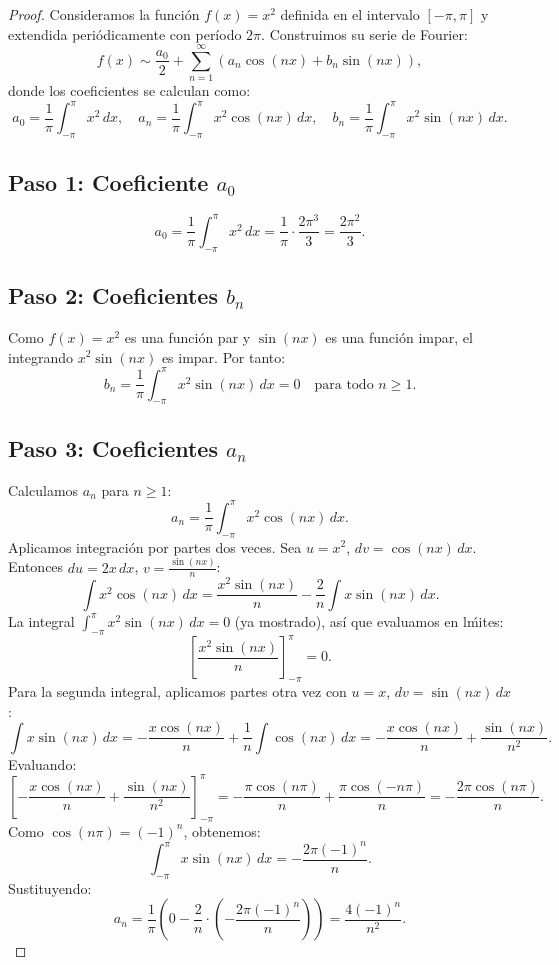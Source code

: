 \documentclass[11pt,a4paper]{article}
\theoremstyle{plain}
\theoremstyle{definition}
\begin{document}
\begin{proof}
Consideramos la funci\'on $f(x) = x^2$ definida en el intervalo $[-\pi, \pi]$ y extendida peri\'odicamente con per\'iodo $2\pi$. Construimos su serie de Fourier:
\[
f(x) \sim \frac{a_0}{2} + \sum_{n=1}^{\infty} \left( a_n \cos(nx) + b_n \sin(nx) \right),
\]
donde los coeficientes se calculan como:
\[
a_0 = \frac{1}{\pi} \int_{-\pi}^{\pi} x^2 \, dx, \quad
a_n = \frac{1}{\pi} \int_{-\pi}^{\pi} x^2 \cos(nx) \, dx, \quad
b_n = \frac{1}{\pi} \int_{-\pi}^{\pi} x^2 \sin(nx) \, dx.
\]

\subsection*{Paso 1: Coeficiente $a_0$}
\[
a_0 = \frac{1}{\pi} \int_{-\pi}^{\pi} x^2 \, dx = \frac{1}{\pi} \cdot \frac{2\pi^3}{3} = \frac{2\pi^2}{3}.
\]

\subsection*{Paso 2: Coeficientes $b_n$}
Como $f(x) = x^2$ es una funci\'on par y $\sin(nx)$ es una funci\'on impar, el integrando $x^2 \sin(nx)$ es impar. Por tanto:
\[
b_n = \frac{1}{\pi} \int_{-\pi}^{\pi} x^2 \sin(nx) \, dx = 0 \quad \text{para todo } n \geq 1.
\]

\subsection*{Paso 3: Coeficientes $a_n$}
Calculamos $a_n$ para $n \geq 1$:
\[
a_n = \frac{1}{\pi} \int_{-\pi}^{\pi} x^2 \cos(nx) \, dx.
\]
Aplicamos integraci\'on por partes dos veces. Sea $u = x^2$, $dv = \cos(nx)\,dx$. Entonces $du = 2x\,dx$, $v = \frac{\sin(nx)}{n}$:
\[
\int x^2 \cos(nx) \, dx = \frac{x^2 \sin(nx)}{n} - \frac{2}{n} \int x \sin(nx) \, dx.
\]
La integral $\int_{-\pi}^{\pi} x^2 \sin(nx) \, dx = 0$ (ya mostrado), as\'i que evaluamos en l\'mites:
\[
\left[ \frac{x^2 \sin(nx)}{n} \right]_{-\pi}^{\pi} = 0.
\]
Para la segunda integral, aplicamos partes otra vez con $u = x$, $dv = \sin(nx)\,dx$:
\[
\int x \sin(nx) \, dx = -\frac{x \cos(nx)}{n} + \frac{1}{n} \int \cos(nx) \, dx = -\frac{x \cos(nx)}{n} + \frac{\sin(nx)}{n^2}.
\]
Evaluando:
\[
\left[ -\frac{x \cos(nx)}{n} + \frac{\sin(nx)}{n^2} \right]_{-\pi}^{\pi} = -\frac{\pi \cos(n\pi)}{n} + \frac{\pi \cos(-n\pi)}{n} = -\frac{2\pi \cos(n\pi)}{n}.
\]
Como $\cos(n\pi) = (-1)^n$, obtenemos:
\[
\int_{-\pi}^{\pi} x \sin(nx) \, dx = -\frac{2\pi (-1)^n}{n}.
\]
Sustituyendo:
\[
a_n = \frac{1}{\pi} \left( 0 - \frac{2}{n} \cdot \left(-\frac{2\pi (-1)^n}{n}\right) \right) = \frac{4(-1)^n}{n^2}.
\]


\end{proof}
\end{document}
